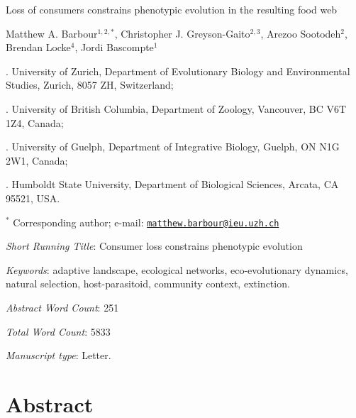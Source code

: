 \documentclass[11pt,]{article}
\title{}
\author{}
\date{}
\begin{document}
\vspace*{0.1cm}

\begin{center} \LARGE Loss of consumers constrains phenotypic evolution in the resulting food web \end{center}

\bigskip

\begin{center} \large Matthew A. Barbour$^{1,2,\ast}$, Christopher J. Greyson-Gaito$^{2,3}$, Arezoo Sootodeh$^{2}$, Brendan Locke$^{4}$, Jordi Bascompte$^{1}$ \normalsize \end{center}

\bigskip

. University of Zurich, Department of Evolutionary Biology
and Environmental Studies, Zurich, 8057 ZH, Switzerland;

. University of British Columbia, Department of Zoology,
Vancouver, BC V6T 1Z4, Canada;

. University of Guelph, Department of Integrative Biology,
Guelph, ON N1G 2W1, Canada;

. Humboldt State University, Department of Biological
Sciences, Arcata, CA 95521, USA.

\(^\ast\) Corresponding author; e-mail:
\href{mailto:matthew.barbour@ieu.uzh.ch}{\nolinkurl{matthew.barbour@ieu.uzh.ch}}

\bigskip

\emph{Short Running Title}: Consumer loss constrains phenotypic
evolution

\bigskip

\emph{Keywords}: adaptive landscape, ecological networks,
eco-evolutionary dynamics, natural selection, host-parasitoid, community
context, extinction.

\bigskip

\emph{Abstract Word Count}: 251

\bigskip

\emph{Total Word Count}: 5833

\bigskip

\emph{Manuscript type}: Letter.

\bigskip

\linenumbers{} \modulolinenumbers[3]

\newpage

\section{Abstract}\label{abstract}
\end{document}
